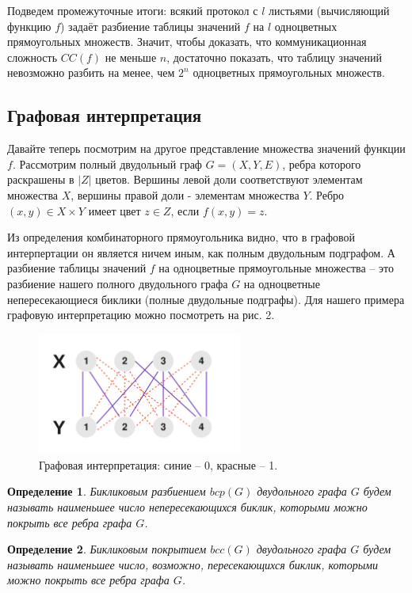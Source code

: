 \documentclass[a4paper]{article}
\newtheorem*{mdefinition}{Определение}
\begin{document}
Подведем промежуточные итоги: всякий протокол с $l$ листьями (вычисляющий функцию $f$) задаёт разбиение
таблицы значений $f$ на $l$ одноцветных прямоугольных множеств. Значит, чтобы доказать, что коммуникационная 
сложность $CC(f)$ не меньше $n$, достаточно показать, что таблицу значений невозможно разбить на менее,
чем $2^n$ одноцветных прямоугольных множеств.

\subsection{Графовая интерпретация}

Давайте теперь посмотрим на другое представление множества значений функции $f$. Рассмотрим полный 
двудольный граф $G = (X, Y, E)$, ребра которого раскрашены в $|Z|$ цветов. Вершины левой доли 
соответствуют элементам множества $X$, вершины правой доли - элементам множества $Y$. Ребро 
$(x, y) \in X\times Y$ имеет цвет $z \in Z$, если $f(x, y) = z$.

Из определения комбинаторного прямоугольника видно, что в графовой интерпертации он является ничем
иным, как полным двудольным подграфом. А разбиение таблицы значений $f$ на одноцветные прямоугольные
множества -- это разбиение нашего  полного двудольного графа $G$ на одноцветные непересекающиеся биклики 
(полные двудольные подграфы). Для нашего примера графовую интерпретацию можно посмотреть на рис. 2.

\begin{figure}
	\centering
	\includegraphics[width=0.6\textwidth]{images/biclique.png}
	\caption{Графовая интерпретация: синие -- 0, красные -- 1.}
\end{figure}

\begin{mdefinition}
	Бикликовым разбиением $bcp(G)$ двудольного графа $G$ будем называть наименьшее число непересекающихся
	биклик, которыми можно покрыть все ребра графа $G$.
\end{mdefinition}


\begin{mdefinition}
	Бикликовым покрытием $bcc(G)$ двудольного графа $G$ будем называть наименьшее число, возможно, 
	пересекающихся биклик, которыми можно покрыть все ребра графа $G$.
\end{mdefinition}
\end{document}
